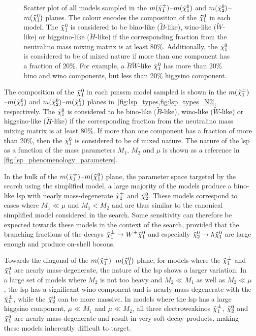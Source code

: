 \begin{figure}
\begin{subfigure}[b]{0.5\linewidth}
		\caption{\label{fig:lsp_types_N2}}
	\end{subfigure}\hfill
	\caption{Scatter plot of all models sampled in the  $m(\tilde{\chi}_1^\pm)$--$m(\tilde{\chi}_1^0)$ and  $m(\tilde{\chi}_2^0)$--$m(\tilde{\chi}_1^0)$ planes. The colour encodes the composition of the $\tilde{\chi}_1^0$ in each model. The $\tilde{\chi}_1^0$ is considered to be bino-like ($\tilde{B}$-like), wino-like ($\tilde{W}$-like) or higgsino-like ($\tilde{H}$-like) if the corresponding fraction from the neutralino mass mixing matrix is at least 80\%. Additionally, the $\tilde{\chi}_1^0$ is considered to be of mixed nature if more than one component has a fraction of 20\%. For example, a $\tilde{B}\tilde{W}$-like $\tilde{\chi}_1^0$ has more than 20\% bino and wino components, but less than 20\% higgsino component.}
	\label{fig:lsp_phenomenology}
\end{figure}


The composition of the $\tilde{\chi}_1^0$ in each \gls{pmssm} model sampled is shown in the $m(\tilde{\chi}_1^\pm)$--$m(\tilde{\chi}_1^0)$ and $m(\tilde{\chi}_2^0)$--$m(\tilde{\chi}_1^0)$ planes in~\cref{fig:lsp_types,fig:lsp_types_N2}, respectively. The $\tilde{\chi}_1^0$ is considered to be bino-like ($\tilde{B}$-like), wino-like ($\tilde{W}$-like) or higgsino-like ($\tilde{H}$-like) if the corresponding fraction from the neutralino mass mixing matrix is at least 80\%. If more than one component has a fraction of more than 20\%, then the $\tilde{\chi}_1^0$ is considered to be of mixed nature. The nature of the \gls{lsp} as a function of the mass parameters $M_1$, $M_2$ and $\mu$ is shown as a reference in \cref{fig:lsp_phenomenology_parameters}. 

In the bulk of the $m(\tilde{\chi}_1^\pm)$--$m(\tilde{\chi}_1^0)$ plane, \ie the parameter space targeted by the \onelepton search using the simplified model, a large majority of the models produce a bino-like \gls{lsp} with nearly mass-degenerate $\tilde{\chi}_1^\pm$ and $\tilde{\chi}_2^0$. These models correspond to cases where $M_1 \ll \mu$ and $M_1 < M_2$ and are thus similar to the canonical simplified model considered in the \onelepton search. Some sensitivity can therefore be expected towards these models in the context of the \onelepton search, provided that the branching fractions of the decays $\tilde{\chi}_1^\pm \rightarrow W^\pm \tilde{\chi}_1^0$ and especially $\tilde{\chi}_2^0 \rightarrow h \tilde{\chi}_1^0$ are large enough and produce on-shell bosons.

Towards the diagonal of the $m(\tilde{\chi}_1^\pm)$--$m(\tilde{\chi}_1^0)$ plane, \ie for models where the $\tilde{\chi}_1^\pm$ and $\tilde{\chi}_1^0$ are nearly mass-degenerate, the nature of the \gls{lsp} shows a larger variation. In a large set of models where $M_2$ is not too heavy and $M_2 \ll M_1$ as well as $M_2 \ll \mu$, the \gls{lsp} has a significant wino component and is nearly mass-degenerate with the $\tilde{\chi}_1^\pm$, while the $\tilde{\chi}_2^0$ can be more massive. In models where the \gls{lsp} has a large higgsino component, \ie $\mu \ll M_1$ and $\mu \ll M_2$, all three electroweakinos $\tilde{\chi}_1^\pm$, $\tilde{\chi}_2^0$ and $\tilde{\chi}_1^0$ are nearly mass-degenerate and result in very soft decay products, making these models inherently difficult to target.

